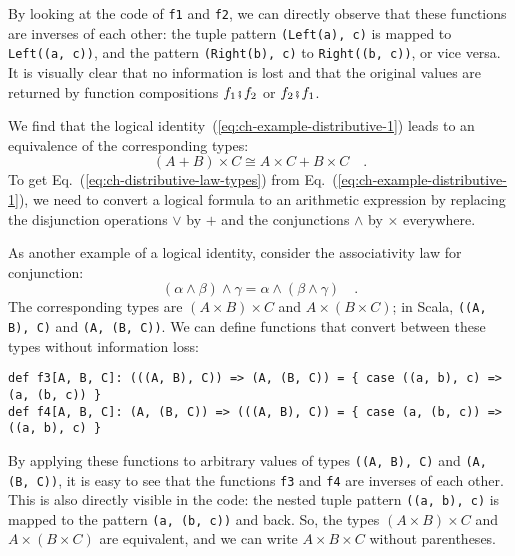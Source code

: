 By looking at the code of \lstinline!f1! and \lstinline!f2!, we
can directly observe that these functions are inverses of each other:
the tuple pattern \lstinline!(Left(a), c)! is mapped to \lstinline!Left((a, c))!,
and the pattern \lstinline!(Right(b), c)! to \lstinline!Right((b, c))!,
or vice versa. It is visually clear that no information is lost and
that the original values are returned by function compositions $f_{1}\bef f_{2}$
or $f_{2}\bef f_{1}$.

We find that the logical identity~(\ref{eq:ch-example-distributive-1})
leads to an equivalence of the corresponding types:
\begin{equation}
\left(A+B\right)\times C\cong A\times C+B\times C\quad.\label{eq:ch-distributive-law-types}
\end{equation}
To get Eq.~(\ref{eq:ch-distributive-law-types}) from Eq.~(\ref{eq:ch-example-distributive-1}),
we need to convert a logical formula to an arithmetic expression by
replacing the disjunction operations $\vee$ by $+$ and the conjunctions
$\wedge$ by $\times$ everywhere.

As another example of a logical identity, consider the associativity
law for conjunction:
\begin{equation}
\left(\alpha\wedge\beta\right)\wedge\gamma=\alpha\wedge\left(\beta\wedge\gamma\right)\quad.\label{eq:ch-example-associativity-conjunction}
\end{equation}
The corresponding types are $(A\times B)\times C$ and $A\times(B\times C)$;
in Scala, \lstinline!((A, B), C)! and \lstinline!(A, (B, C))!. We
can define functions that convert between these types without information
loss:
\begin{lstlisting}
def f3[A, B, C]: (((A, B), C)) => (A, (B, C)) = { case ((a, b), c) => (a, (b, c)) }
def f4[A, B, C]: (A, (B, C)) => (((A, B), C)) = { case (a, (b, c)) => ((a, b), c) }
\end{lstlisting}
By applying these functions to arbitrary values of types \lstinline!((A, B), C)!
and \lstinline!(A, (B, C))!, it is easy to see that the functions
\lstinline!f3! and \lstinline!f4! are inverses of each other. This
is also directly visible in the code: the nested tuple pattern \lstinline!((a, b), c)!
is mapped to the pattern \lstinline!(a, (b, c))! and back. So, the
types $\left(A\times B\right)\times C$ and $A\times\left(B\times C\right)$
are equivalent, and we can write $A\times B\times C$ without parentheses.

